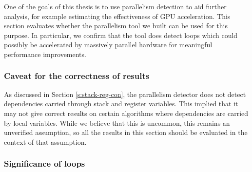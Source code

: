 \documentclass[12pt,twoside]{reedthesis}
\begin{document}
		One of the goals of this thesis is to use parallelism detection to aid further analysis, for example estimating the effectiveness of GPU acceleration. 
		This section evaluates whether the parallelism tool we built can be used for this purpose. In particular, we confirm that the tool does detect loops which could possibly be accelerated by massively parallel hardware for meaningful performance improvements. 
		
		
		\subsubsection{Caveat for the correctness of results}
		
		As discussed in Section \ref{s:stack-reg-con}, the parallelism detector does not detect dependencies carried through stack and register variables. This implied that it may not give correct results on certain algorithms where dependencies are carried by local variables. While we believe that this is uncommon, this remains an unverified assumption, so all the results in this section should be evaluated in the context of that assumption.
		
		\subsubsection{Significance of loops}
		
\end{document}
